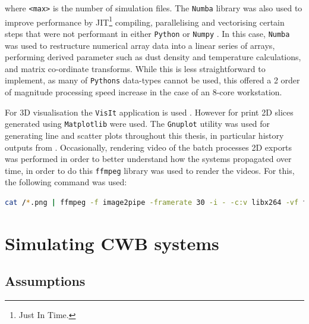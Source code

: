 \noindent
where \texttt{<max>} is the number of simulation files.
The \texttt{Numba} library \parencite{lam2015numba} was also used to improve performance by  JIT\footnote{Just In Time.} compiling, parallelising and vectorising certain steps that were not performant in either \texttt{Python} or \texttt{Numpy} \parencite{harris2020array}.
In this case, \texttt{Numba} was used to restructure numerical array data into a linear series of arrays, performing derived parameter such as dust density and temperature calculations, and matrix co-ordinate transforms.
While this is less straightforward to implement, as many of \texttt{Pythons} data-types cannot be used, this offered a 2 order of magnitude processing speed increase in the case of an 8-core workstation.

For 3D visualisation the \texttt{VisIt} application is used \parencite{HPV:VisIt}.
However for print 2D slices generated using \texttt{Matplotlib} were used. 
The \texttt{Gnuplot} utility \parencite{gnuplot} was used for generating line and scatter plots throughout this thesis, in particular history outputs from \athena{}.
Occasionally, rendering video of the batch processes 2D exports was performed in order to better understand how the systems propagated over time, in order to do this \texttt{ffmpeg} library \parencite{tomar2006converting} was used to render the videos.
For this, the following command was used:

\begin{lstlisting}[language=bash]
cat /*.png | ffmpeg -f image2pipe -framerate 30 -i - -c:v libx264 -vf format=yuv420p output.mp4
\end{lstlisting}

\section{Simulating CWB systems}




\subsection{Assumptions}
\label{sec:simassumptions}


